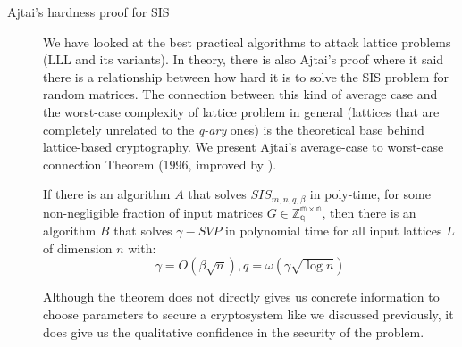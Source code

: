 \begin{description}
        \item [Ajtai's hardness proof for SIS] We have looked at the best
            practical
            algorithms to attack lattice problems (LLL and its variants). In
            theory, there is also Ajtai's proof where it said there is a
            relationship between how hard it is to solve the SIS
            problem for random matrices. The connection between this kind of
            average case and the worst-case complexity of lattice problem in
            general (lattices that are completely unrelated to the
            \emph{q-ary} ones) is the theoretical base behind lattice-based
            cryptography. We present Ajtai's average-case to worst-case
            connection Theorem (1996, improved by \cite{gentry2008trapdoors}).

            \begin{theorem}
                 If there is an algorithm
                $A$ that solves $SIS_{m,n,q,\beta}$ in poly-time, for some
                non-negligible fraction of input matrices $G \in \mathbb{Z_q^{m
                \times n}}$, then there is an algorithm $B$ that solves
                $\gamma-SVP$ in polynomial time for all input lattices
                $L$ of dimension $n$ with:
                \[
                    \gamma = O(\beta\sqrt{n}), q = \omega(\gamma\sqrt{\log n})
                \]
                \label{theo:AjtaiHardness}
            \end{theorem}

            Although the theorem does not directly gives us concrete
            information to choose parameters to secure a cryptosystem like we
            discussed previously, it does give us the qualitative confidence in
            the security of the problem.


    \end{description}

